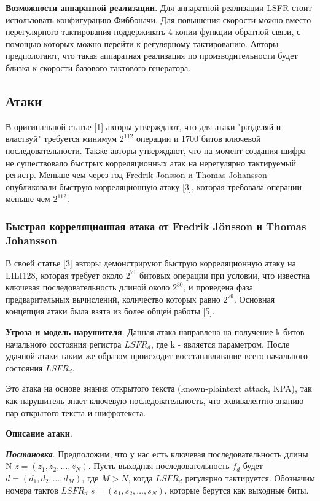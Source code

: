 \documentclass[colorthm]{./civarticle}
\begin{document}
\textbf{Возможности аппаратной реализации}. Для аппаратной реализации LSFR стоит использовать конфигурацию Фиббоначи. Для повышения скорости можно вместо нерегулярного тактирования поддерживать 4 копии функции обратной связи, с помощью которых можно перейти к регулярному тактированию. Авторы предпологают, что такая аппаратная реализация по производительности будет близка к скорости базового тактового генератора.



\subsection{Атаки}

В оригинальной статье [1] авторы утверждают, что для атаки "разделяй и властвуй" требуется минимум $2^{112}$ операции и 1700 битов ключевой последовательности. Также авторы утверждают, что на момент создания шифра не существовало быстрых корреляционных атак на нерегулярно тактируемый регистр. Меньше чем через год Fredrik Jönsson и Thomas Johansson опубликовали быструю корреляционную атаку [3], которая требовала операции меньше чем $2^{112}$.

\subsubsection{Быстрая корреляционная атака от Fredrik Jönsson и Thomas Johansson}

В своей статье [3] авторы демонстрируют быструю корреляционную атаку на LILI128, которая требует около $2^{71}$ битовых операции при условии, что известна ключевая последовательность длиной около $2^{30}$, и проведена фаза предварительных вычислений, количество которых равно $2^{79}$. Основная концепция атаки была взята из более общей работы [5].

\textbf{Угроза и модель нарушителя}. Данная атака направлена на получение k битов начального состояния регистра $LSFR_d$, где k - является параметром. После удачной атаки таким же образом происходит восстанавливание всего начального состояния $LSFR_d$. 

Это атака на основе знания открытого текста (known-plaintext attack, KPA), так как нарушитель знает ключевую последовательность, что эквивалентно знанию пар открытого текста и шифротекста.

\textbf{Описание атаки}.

\textbf{\emph{Постановка}}. Предположим, что у нас есть ключевая последовательность длины N $z = (z_1, z_2, \dots, z_N)$. Пусть выходная последовательность $f_d$ будет $d = (d_1, d_2, \dots, d_M)$, где $M > N$, когда $LSFR_d$ регулярно тактируется. Обозначим номера тактов $LSFR_d$ \space $s = (s_1, s_2, \dots, s_N)$, которые берутся как выходные биты.
\end{document}
